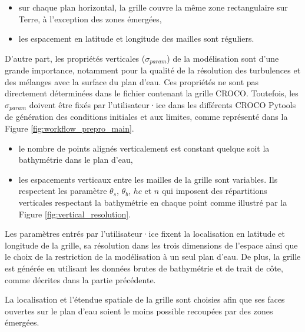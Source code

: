 \documentclass[10pt,a4paper,titlepage]{article}
\begin{document}
\begin{itemize}
    \item sur chaque plan horizontal, la grille couvre la même zone rectangulaire sur Terre, à l'exception des zones émergées,
    \item les espacement en latitude et longitude des mailles sont réguliers.
\end{itemize}

D'autre part, les propriétés verticales ($\sigma_{param}$) de la modélisation sont d'une grande importance, notamment pour la qualité de la résolution des turbulences et des mélanges avec la surface du plan d'eau.
Ces propriétés ne sont pas directement déterminées dans le fichier contenant la grille CROCO.
Toutefois, les $\sigma_{param}$ doivent être fixés par l'utilisateur·ice dans les différents CROCO Pytools de génération des conditions initiales et aux limites, comme représenté dans la Figure \ref{fig:workflow_prepro_main}.

\begin{itemize}
    \item le nombre de points alignés verticalement est constant quelque soit la bathymétrie dans le plan d'eau,
    \item les espacements verticaux entre les mailles de la grille sont variables. Ils respectent les paramètre $\theta_s$, $\theta_b$, $hc$ et $n$ qui imposent des répartitions verticales respectant la bathymétrie en chaque point comme illustré par la Figure \ref{fig:vertical_resolution}.
\end{itemize}


Les paramètres entrés par l'utilisateur·ice fixent la localisation en latitude et longitude de la grille, sa résolution dans les trois dimensions de l'espace ainsi que le choix de la restriction de la modélisation à un seul plan d'eau.
De plus, la grille est générée en utilisant les données brutes de bathymétrie et de trait de côte, comme décrites dans la partie précédente.

La localisation et l'étendue spatiale de la grille sont choisies afin que ses faces ouvertes sur le plan d'eau soient le moins possible recoupées par des zones émergées.
\end{document}
